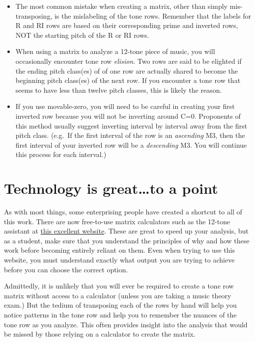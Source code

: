 \documentclass{book}
\providecommand{\tightlist}{%
  \setlength{\itemsep}{0pt}\setlength{\parskip}{0pt}}
\begin{document}
\begin{itemize}
\tightlist
\item
  The most common mistake when creating a matrix, other than simply
  mis-transposing, is the mislabeling of the tone rows. Remember that the
  labels for R and RI rows are based on their corresponding prime and inverted
  rows, NOT the starting pitch of the R or RI rows.
\item
  When using a matrix to analyze a 12-tone piece of music, you will
  occasionally encounter tone row \emph{elision}. Two rows are said to be
  elighted if the ending pitch class(es) of of one row are actually shared to
  become the beginning pitch class(es) of the next row. If you encounter a
  tone row that seems to have less than twelve pitch classes, this is likely
  the reason.
\item
  If you use movable-zero, you will need to be careful in creating your first
  inverted row because you will not be inverting around C=0. Proponents of
  this method usually suggest inverting interval by interval away from the
  first pitch class. (e.g.~If the first interval of the row is an
  \emph{ascending} M3, then the first interval of your inverted row will be a
  \emph{descending} M3. You will continue this process for each interval.)
\end{itemize}

\hypertarget{technology-is-greatto-a-point}{%
\section{Technology is great\ldots to a
point}\label{technology-is-greatto-a-point}}

As with most things, some enterprising people have created a shortcut to all
of this work. There are now free-to-use matrix calculators such as the 12-tone
assistant at
\href{http://in.music.sc.edu/fs/bain/software/tta-v2.4d/default.htm}{this
excellent website}. These are great to speed up your analysis, but as a
student, make sure that you understand the principles of why and how these
work before becoming entirely reliant on them. Even when trying to use this
website, you must understand exactly what output you are trying to achieve
before you can choose the correct option.

Admittedly, it is unlikely that you will ever be required to create a tone row
matrix without access to a calculator (unless you are taking a music theory
exam.) But the tedium of transposing each of the rows by hand will help you
notice patterns in the tone row and help you to remember the nuances of the
tone row as you analyze. This often provides insight into the analysis that
would be missed by those relying on a calculator to create the matrix.
\end{document}
